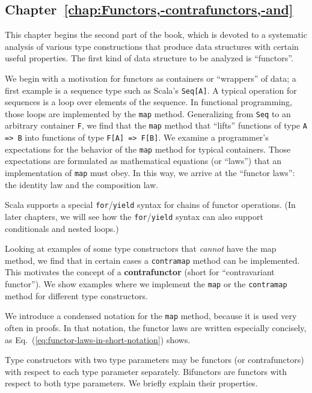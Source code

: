 \subsection{Chapter~\ref{chap:Functors,-contrafunctors,-and}}

This chapter begins the second part of the book, which is devoted
to a systematic analysis of various type constructions that produce
data structures with certain useful properties. The first kind of
data structure to be analyzed is \textsf{``}functors\textsf{''}.

We begin with a motivation for functors as containers or \textsf{``}wrappers\textsf{''}
of data; a first example is a sequence type such as Scala\textsf{'}s \lstinline!Seq[A]!.
A typical operation for sequences is a loop over elements of the sequence.
In functional programming, those loops are implemented by the \lstinline!map!
method. Generalizing from \lstinline!Seq! to an arbitrary container
\lstinline!F!, we find that the \lstinline!map! method that \textsf{``}lifts\textsf{''}
functions of type \lstinline!A => B! into functions of type \lstinline!F[A] => F[B]!.
We examine a programmer\textsf{'}s expectations for the behavior of the \lstinline!map!
method for typical containers. Those expectations are formulated as
mathematical equations (or \textsf{``}laws\textsf{''}) that an implementation of \lstinline!map!
must obey. In this way, we arrive at the \textsf{``}functor laws\textsf{''}: the identity
law and the composition law.

Scala supports a special \lstinline!for!/\lstinline!yield! syntax
for chains of functor operations. (In later chapters, we will see
how the \lstinline!for!/\lstinline!yield! syntax can also support
conditionals and nested loops.)

Looking at examples of some type constructors that \emph{cannot} have
the map method, we find that in certain cases a \lstinline!contramap!
method can be implemented. This motivates the concept of a \textbf{contrafunctor}
(short for \textsf{``}contravariant functor\textsf{''}). We show examples where we
implement the \lstinline!map! or the \lstinline!contramap! method
for different type constructors.

We introduce a condensed notation for the \lstinline!map! method,
because it is used very often in proofs. In that notation, the functor
laws are written especially concisely, as Eq.~(\ref{eq:functor-laws-in-short-notation})
shows.

Type constructors with two type parameters may be functors (or contrafunctors)
with respect to each type parameter separately. Bifunctors are functors
with respect to both type parameters. We briefly explain their properties.

